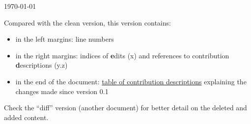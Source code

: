 \setcounter{page}{-1}

\vspace{5.3em}
\begingroup\nolinenumbers\centering
{}

\scalebox{1.25}{in the ZKProof Community Reference version 0.2}


\vspace{1em}
\today


\raggedright
\vspace{2em}
Compared with the clean version, this version contains:
\vspace{.5em}\begin{itemize}\setlength{\itemsep}{.5em}
\item in the left margins: line numbers
\item in the right margins: indices of \textbf{e}dits (\textbf{}x) and references to contribution \textbf{d}escriptions (\textbf{}y.z)
\item in the end of the document: \hyperref[app:table-comments]{table of contribution descriptions} explaining the changes made since version 0.1
\end{itemize}

\vspace{2em}
Check the ``diff'' version (another document) for better detail on the deleted and added content.


\vfill
\renewcommand\cftloctitlefont{\bfseries\LARGE}
\listofcontribution

\endgroup
\thispagestyle{empty}

\clearpage\null\thispagestyle{intentionallyblank}\clearpage
